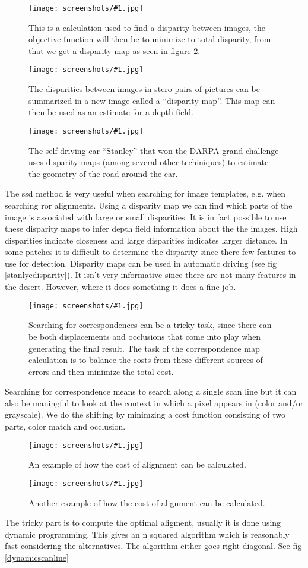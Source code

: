 \documentclass[a4, 12pt, english, USenglish]{scrreprt}
\newcommand{\screenshot}[2]{
\begin{figure}[htb]
\texttt{[image: screenshots/\#1.jpg]}
\label{#1}
\caption{#2}
\end{figure}}
\begin{document}
\screenshot{ssdcalculation}{This is a calculation used to find a
  disparity between images, the objective function will then be to
  minimize to total disparity, from that we get a disparity map as
  seen in figure \ref{disparitymap}.}

\screenshot{disparitymap}{The disparities between images in stero
  pairs of   pictures  can be summarized in a new image called a
  ``disparity map''.  This map can then be used as an estimate for a
  depth field.}

\screenshot{stanleydisparity}{The self-driving car ``Stanley'' that
  won the DARPA grand challenge uses disparity maps (among several
  other techiniques) to estimate the geometry of the road around the car.}

The ssd method is very useful when searching for image templates,
e.g. when searching ror alignments.  Using a disparity map  we can
find which parts of the image is associated with large or small
disparities.   It is in fact possible to use these disparity maps to
infer depth field information about the the images.   High disparities
indicate closeness and large disparities indicates larger distance.
In some patches it is difficult to determine the disparity since there
few features to use for detection.    Disparity maps can be used in
automatic driving (see fig \ref{stanlyedisparity}).  It isn't very
informative since there are not many features in the desert.  However,
where it does something it does a fine job.

\screenshot{colorcorrespondence}{Searching for correspondences can be
  a tricky task, since there can be both displacements and occlusions
  that come into play when generating the final result.  The task of
  the correspondence map calculation is to balance the costs from
  these different sources of errors and then minimize the total cost.}

Searching for correspondence means to search along a single scan line
but it can also be maningful to look at the context in which a pixel
appears in (color and/or grayscale).  We do the shifting by minimzing
a cost function consisting of two parts, color match and occlusion.

\screenshot{costfunctionalignment}{An example of how the cost of
  alignment can be calculated.}
\screenshot{costfunctionalignment2}{Another example of how the cost of
alignment can be calculated.}

The tricky part is to compute the optimal aligment, usually it is done
using dynamic programming.   This gives an n squared algorithm which
is reasonably fast considering the alternatives.  The algorithm either
goes right diagonal.  See fig \ref{dynamicscanline}
\end{document}
